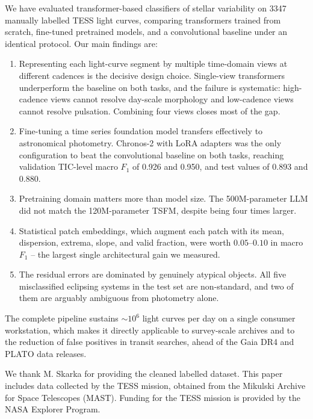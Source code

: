 \documentclass{aa}
\begin{document}
    We have evaluated transformer-based classifiers of stellar variability on 3347 manually
    labelled TESS light curves, comparing transformers trained from scratch, fine-tuned
    pretrained models, and a convolutional baseline under an identical protocol. Our main
    findings are:

    \begin{enumerate}
        \item Representing each light-curve segment by multiple time-domain views at different
        cadences is the decisive design choice. Single-view transformers underperform the
        baseline on both tasks, and the failure is systematic: high-cadence views cannot
        resolve day-scale morphology and low-cadence views cannot resolve pulsation.
        Combining four views closes most of the gap.
        \item Fine-tuning a time series foundation model transfers effectively to astronomical
        photometry. Chronos-2 with LoRA adapters was the only configuration to beat the
        convolutional baseline on both tasks, reaching validation TIC-level macro $F_1$ of
        0.926 and 0.950, and test values of 0.893 and 0.880.
        \item Pretraining domain matters more than model size. The 500M-parameter LLM did not
        match the 120M-parameter TSFM, despite being four times larger.
        \item Statistical patch embeddings, which augment each patch with its mean, dispersion,
        extrema, slope, and valid fraction, were worth $0.05$--$0.10$ in macro $F_1$ -- the
        largest single architectural gain we measured.
        \item The residual errors are dominated by genuinely atypical objects. All five
        misclassified eclipsing systems in the test set are non-standard, and two of them
        are arguably ambiguous from photometry alone.
    \end{enumerate}

    The complete pipeline sustains $\sim10^6$ light curves per day on a single consumer
    workstation, which makes it directly applicable to survey-scale archives and to the
    reduction of false positives in transit searches, ahead of the Gaia DR4 and PLATO data
    releases.

    \begin{acknowledgements}
        We thank M. Skarka for providing the cleaned labelled dataset. This paper includes data
        collected by the TESS mission, obtained from the Mikulski Archive for Space Telescopes
        (MAST). Funding for the TESS mission is provided by the NASA Explorer Program.
    \end{acknowledgements}
\end{document}
